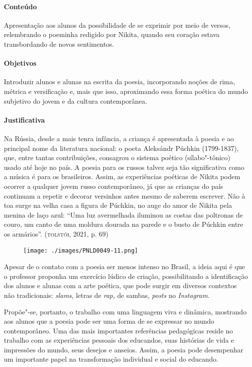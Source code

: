 \documentclass{article}
\begin{document}
\paragraph{Conteúdo}
Apresentação aos alunos da possibilidade de se exprimir por meio de
versos, relembrando o poeminha redigido por Nikita, quando seu coração
estava transbordando de novos sentimentos.

\paragraph{Objetivos}
Introduzir alunos e alunas na escrita da poesia, incorporando noções de
rima, métrica e versificação e, mais que isso, aproximando essa forma
poética do mundo subjetivo do jovem e da cultura contemporânea.

\paragraph{Justificativa}
Na Rússia, desde a mais tenra infância, a criança é apresentada à poesia
e ao principal nome da literatura nacional: o poeta Aleksándr Púchkin
(1799-1837), que, entre tantas contribuições, consagrou o sistema
poético (sílabo"-tônico) usado até hoje no país. A poesia para os russos
talvez seja tão significativa como a música é para os brasileiros.
Assim, as experiências poéticas de Nikita podem ocorrer a qualquer jovem
russo contemporâneo, já que as crianças do país continuam a repetir e
decorar versinhos antes mesmo de saberem escrever. Não à toa surge na
velha casa a figura de Púchkin, no auge do amor de Nikita pela menina de
laço azul: ``Uma luz avermelhada iluminou as costas das poltronas de
couro, um canto de uma moldura dourada na parede e o busto de Púchkin
entre os armários''. (\textsc{tolstói}, 2021, p. 69)


\begin{figure}[ht!]
\texttt{[image: ./images/PNLD0049-11.png]}
\end{figure}

Apesar de o contato com a poesia ser menos intenso no Brasil, a ideia
aqui é que o professor proponha um exercício lúdico de criação,
possibilitando a identificação dos alunos e alunas com a arte poética,
que pode surgir em diversos contextos não tradicionais: \emph{slams},
letras de \emph{rap,} de sambas, \emph{posts} no \emph{Instagram}.

Propõe"-se, portanto, o trabalho com uma linguagem viva e dinâmica,
mostrando aos alunos que a poesia pode ser uma forma de se expressar no
mundo contemporâneo. Uma das mais importantes referências pedagógicas
reside no trabalho com as experiências pessoais dos educandos, suas
histórias de vida e impressões do mundo, seus desejos e anseios. Assim,
a poesia pode desempenhar um importante papel na transformação
individual e social do educando.
\end{document}
